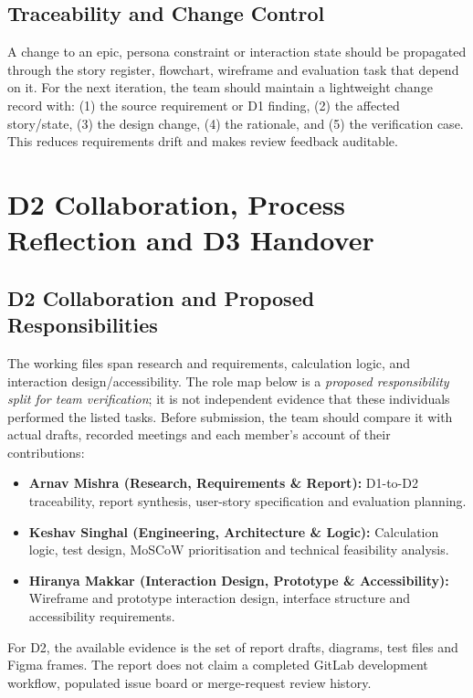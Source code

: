 \documentclass[12pt,a4paper]{article}
\begin{document}
\subsection{Traceability and Change Control}
A change to an epic, persona constraint or interaction state should be propagated through the story register, flowchart, wireframe and evaluation task that depend on it. For the next iteration, the team should maintain a lightweight change record with: (1) the source requirement or D1 finding, (2) the affected story/state, (3) the design change, (4) the rationale, and (5) the verification case. This reduces requirements drift and makes review feedback auditable.

\section{D2 Collaboration, Process Reflection and D3 Handover}

\subsection{D2 Collaboration and Proposed Responsibilities}
The working files span research and requirements, calculation logic, and interaction design/accessibility. The role map below is a \emph{proposed responsibility split for team verification}; it is not independent evidence that these individuals performed the listed tasks. Before submission, the team should compare it with actual drafts, recorded meetings and each member's account of their contributions:
\begin{itemize}[leftmargin=*]
  \item \textbf{Arnav Mishra (Research, Requirements \& Report):} D1-to-D2 traceability, report synthesis, user-story specification and evaluation planning.
  \item \textbf{Keshav Singhal (Engineering, Architecture \& Logic):} Calculation logic, test design, MoSCoW prioritisation and technical feasibility analysis.
  \item \textbf{Hiranya Makkar (Interaction Design, Prototype \& Accessibility):} Wireframe and prototype interaction design, interface structure and accessibility requirements.
\end{itemize}
For D2, the available evidence is the set of report drafts, diagrams, test files and Figma frames. The report does not claim a completed GitLab development workflow, populated issue board or merge-request review history.
\end{document}
